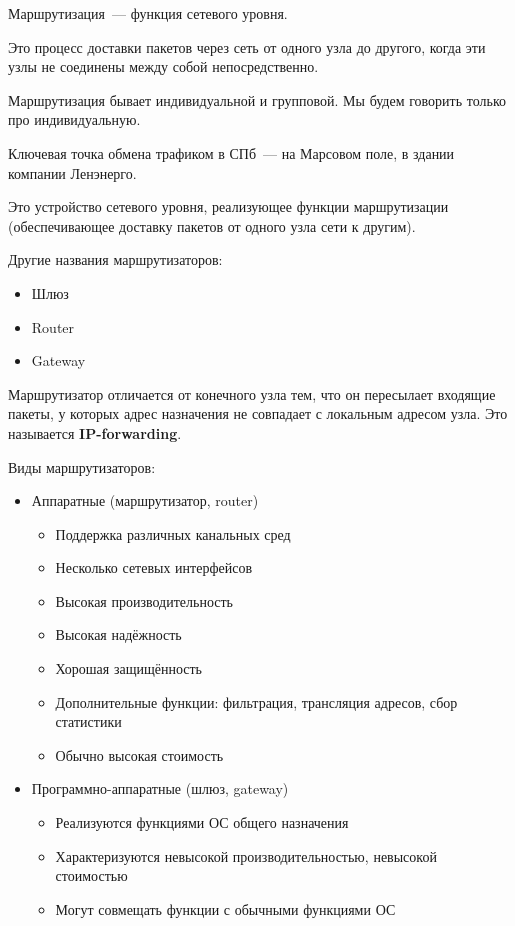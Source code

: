 
Маршрутизация~--- функция сетевого уровня.

Это процесс доставки пакетов через сеть от одного узла до другого, когда эти узлы не соединены между собой непосредственно.

Маршрутизация бывает индивидуальной и групповой. Мы будем говорить только про индивидуальную.

Ключевая точка обмена трафиком в СПб~--- на Марсовом поле, в здании компании Ленэнерго.


Это устройство сетевого уровня, реализующее функции маршрутизации (обеспечивающее доставку пакетов от одного узла сети к другим).

Другие названия маршрутизаторов:
\begin{itemize}
    \item Шлюз
    \item Router
    \item Gateway
\end{itemize}

Маршрутизатор отличается от конечного узла тем, что он пересылает входящие пакеты, у которых адрес назначения не совпадает с локальным адресом узла. Это называется {\bf IP-forwarding}.

Виды маршрутизаторов:
\begin{itemize}
    \item Аппаратные (маршрутизатор, router)
    \begin{itemize}
        \item Поддержка различных канальных сред
        \item Несколько сетевых интерфейсов
        \item Высокая производительность
        \item Высокая надёжность
        \item Хорошая защищённость
        \item Дополнительные функции: фильтрация, трансляция адресов, сбор статистики
        \item Обычно высокая стоимость
    \end{itemize}
    \item Программно-аппаратные (шлюз, gateway)
    \begin{itemize}
        \item Реализуются функциями ОС общего назначения
        \item Характеризуются невысокой производительностью, невысокой стоимостью
        \item Могут совмещать функции с обычными функциями ОС
    \end{itemize}
\end{itemize}

